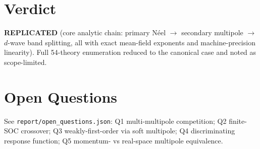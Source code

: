 \documentclass[11pt]{article}
\begin{document}
\section{Verdict}
\textbf{REPLICATED} (core analytic chain: primary N\'eel $\to$ secondary multipole $\to$ $d$-wave
band splitting, all with exact mean-field exponents and machine-precision linearity). Full
54-theory enumeration reduced to the canonical case and noted as scope-limited.

\section*{Open Questions}
See \texttt{report/open\_questions.json}: Q1 multi-multipole competition; Q2 finite-SOC crossover;
Q3 weakly-first-order via soft multipole; Q4 discriminating response function; Q5 momentum- vs
real-space multipole equivalence.
\end{document}
